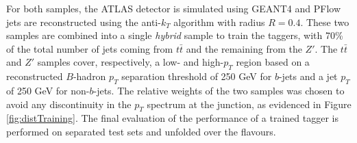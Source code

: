 For both samples, the ATLAS detector is simulated using GEANT4 \cite{Agostinelli:602040} and PFlow jets are reconstructed using the anti-$k_T$ algorithm with radius $R = 0.4$. These two samples are combined into a single \textit{hybrid} sample to train the taggers, with 70\% of the total number of jets coming from $t\bar{t}$ and the remaining from the $Z'$. The $t\bar{t}$ and $Z'$ samples cover, respectively, a low- and high-$p_T$ region based on a reconstructed $B$-hadron $p_T$ separation threshold of 250 GeV for $b$-jets and a jet $p_T$ of 250 GeV for non-$b$-jets. The relative weights of the two samples was chosen to avoid any discontinuity in the $p_T$ spectrum at the junction, as evidenced in Figure \ref{fig:distTraining}. The final evaluation of the performance of a trained tagger is performed on separated test sets and unfolded over the flavours.\\

